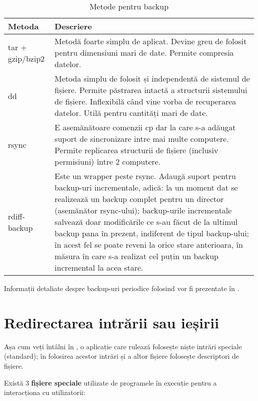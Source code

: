 \begin{table}[htb]
\caption{Metode pentru backup}
\begin{center}
	\begin{tabular}{ p{} p{} }
	\toprule
		\textbf{Metoda} & \textbf{Descriere} \\
	\midrule
		tar + gzip/bzip2 & Metodă foarte simplu de aplicat. Devine greu
		de folosit pentru dimensiuni mari de date. Permite compresia
		datelor. \\
	\midrule
		dd & Metoda simplu de folosit și independentă de sistemul de
		fișiere. Permite păstrarea intactă a structurii sistemului de
		fișiere. Inflexibilă când vine vorba de recuperarea datelor.
		Utilă pentru cantități mari de date. \\
	\midrule
		rsync & E asemănătoare comenzii cp dar la care s-a adăugat
		suport de sincronizare intre mai multe computere. Permite
		replicarea structurii de fișiere (inclusiv permisiuni) între 2
		computere. \\
	\midrule
		rdiff-backup & Este un wrapper peste rsync. Adaugă suport pentru
		backup-uri incrementale, adică: la un moment dat se realizează
		un backup complet pentru un director (asemănător rsync-ului);
		backup-urile incrementale salvează doar modificările ce s-au
		făcut de la ultimul backup pana în prezent, indiferent de tipul
		backup-ului; în acest fel se poate reveni la orice stare
		anterioara, în măsura în care s-a realizat cel puțin un backup
		incremental la acea stare. \\
	\bottomrule
	\end{tabular}
	\label{table:file-system-backup-cmd}
\end{center}
\end{table}

Informații detaliate despre backup-uri periodice folosind  vor fi
prezentate în .

\section{Redirectarea intrării sau ieșirii}
\label{sec:file-system-redirect}

Așa cum veți întâlni în
, o aplicație care
rulează folosește niște intrări speciale (standard); în folosirea acestor
intrări și a altor fișiere folosește descriptori de fișiere.

Există 3 \textbf{fișiere speciale} utilizate de programele în execuție pentru a
interacționa cu utilizatorii:

